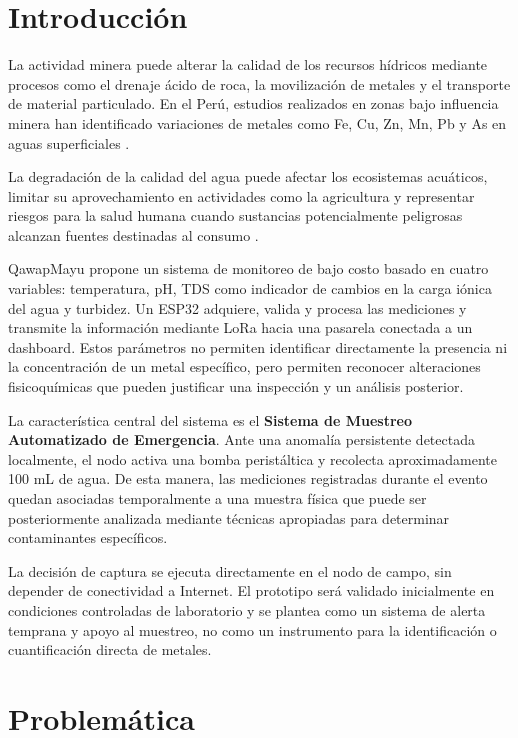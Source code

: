 \documentclass[11pt,a4paper]{article}
\begin{document}
\section{Introducción}

La actividad minera puede alterar la calidad de los recursos hídricos mediante procesos como el drenaje ácido de roca, la movilización de metales y el transporte de material particulado. En el Perú, estudios realizados en zonas bajo influencia minera han identificado variaciones de metales como Fe, Cu, Zn, Mn, Pb y As en aguas superficiales \cite{moreno2024,ocona2024}.

La degradación de la calidad del agua puede afectar los ecosistemas acuáticos, limitar su aprovechamiento en actividades como la agricultura y representar riesgos para la salud humana cuando sustancias potencialmente peligrosas alcanzan fuentes destinadas al consumo \cite{moreno2024,faoWaterQuality,whoDrinkingWater2026}.

QawapMayu propone un sistema de monitoreo de bajo costo basado en cuatro variables: temperatura, pH, TDS como indicador de cambios en la carga iónica del agua y turbidez. Un ESP32 \cite{esp32} adquiere, valida y procesa las mediciones y transmite la información mediante LoRa hacia una pasarela conectada a un dashboard. Estos parámetros no permiten identificar directamente la presencia ni la concentración de un metal específico, pero permiten reconocer alteraciones fisicoquímicas que pueden justificar una inspección y un análisis posterior.

La característica central del sistema es el \textbf{Sistema de Muestreo Automatizado de Emergencia}. Ante una anomalía persistente detectada localmente, el nodo activa una bomba peristáltica y recolecta aproximadamente 100 mL de agua. De esta manera, las mediciones registradas durante el evento quedan asociadas temporalmente a una muestra física que puede ser posteriormente analizada mediante técnicas apropiadas para determinar contaminantes específicos.

La decisión de captura se ejecuta directamente en el nodo de campo, sin depender de conectividad a Internet. El prototipo será validado inicialmente en condiciones controladas de laboratorio y se plantea como un sistema de alerta temprana y apoyo al muestreo, no como un instrumento para la identificación o cuantificación directa de metales.

\section{Problemática}
\end{document}

